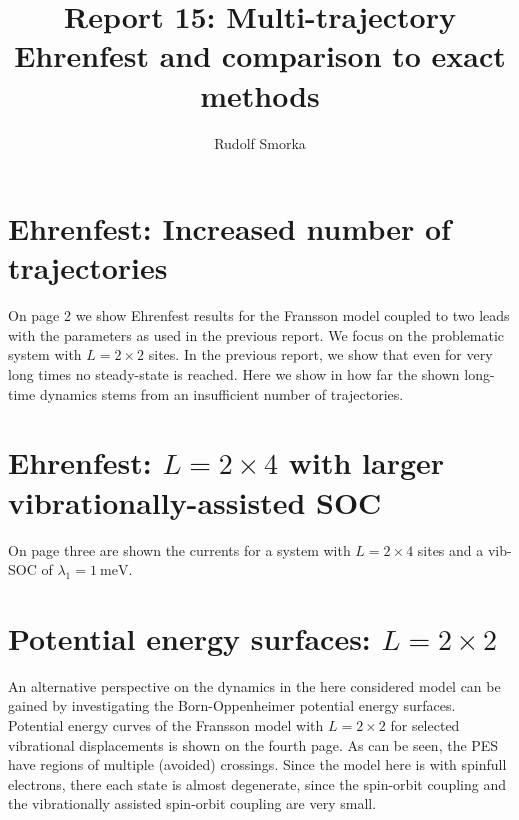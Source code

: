 \documentclass{article}
\begin{document}
\title{Report 15: Multi-trajectory Ehrenfest and comparison to exact methods}
\author{Rudolf Smorka}
\maketitle
\section{Ehrenfest: Increased number of trajectories}
On page 2 we show Ehrenfest results for the Fransson model coupled to two leads with the parameters as used in the previous report. We focus on the problematic system with $L=2\times 2$ sites. In the previous report, we show that even for very long times no steady-state is reached. Here we show in how far the shown long-time dynamics stems from an insufficient number of trajectories.
\section{Ehrenfest: $L=2\times 4$ with larger vibrationally-assisted SOC}
On page three are shown the currents for a system with $L=2\times 4$ sites and a vib-SOC of $\lambda_1=\SI{1}{\milli\electronvolt}$. 
\section{Potential energy surfaces: $L=2\times 2$}
An alternative perspective on the dynamics in the here considered model can be gained by investigating the Born-Oppenheimer potential energy surfaces.
Potential energy curves of the Fransson model with $L=2\times 2$ for selected vibrational displacements is shown on the fourth page.
As can be seen, the PES have regions of multiple (avoided) crossings. Since the model here is with spinfull electrons, there each state is almost degenerate, since the spin-orbit coupling and the vibrationally assisted spin-orbit coupling are very small.



\end{document}
